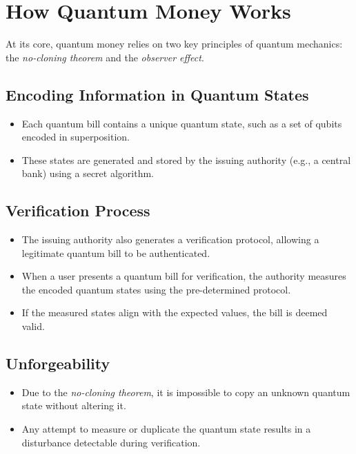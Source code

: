 \documentclass[11pt]{article}
\theoremstyle{definition}
\begin{document}
\section*{How Quantum Money Works}
At its core, quantum money relies on two key principles of quantum mechanics: the \textit{no-cloning theorem} and the \textit{observer effect}.

\subsection*{Encoding Information in Quantum States}
\begin{itemize}
    \item Each quantum bill contains a unique quantum state, such as a set of qubits encoded in superposition.
    \item These states are generated and stored by the issuing authority (e.g., a central bank) using a secret algorithm.
\end{itemize}

\subsection*{Verification Process}
\begin{itemize}
    \item The issuing authority also generates a verification protocol, allowing a legitimate quantum bill to be authenticated.
    \item When a user presents a quantum bill for verification, the authority measures the encoded quantum states using the pre-determined protocol.
    \item If the measured states align with the expected values, the bill is deemed valid.
\end{itemize}

\subsection*{Unforgeability}
\begin{itemize}
    \item Due to the \textit{no-cloning theorem}, it is impossible to copy an unknown quantum state without altering it.
    \item Any attempt to measure or duplicate the quantum state results in a disturbance detectable during verification.
\end{itemize}
\end{document}
